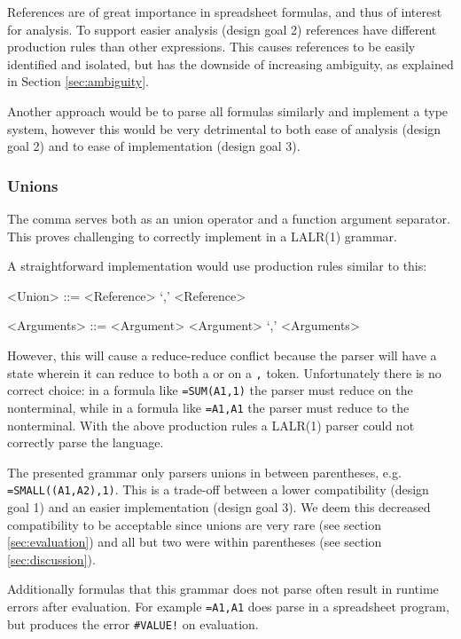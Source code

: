 \documentclass[conference]{IEEEtran}
\begin{document}
References are of great importance in spreadsheet formulas, and thus of interest for analysis.
To support easier analysis (design goal 2) references have different production rules than other expressions.
This causes references to be easily identified and isolated, but has the downside of increasing ambiguity, as explained in Section \ref{sec:ambiguity}. 

Another approach would be to parse all formulas similarly and implement a type system, however this would be very detrimental to both ease of analysis (design goal 2) and to ease of implementation (design goal 3).

\subsubsection{\textbf{Unions}}
\label{subsec:desing:unions}

The comma serves both as an union operator and a function argument separator.
This proves challenging to correctly implement in a LALR(1) grammar.

A straightforward implementation would use production rules similar to this:
\begin{grammar}
<Union> ::= <Reference> `,' <Reference>

<Arguments> ::= <Argument>
	\alt <Argument> `,' <Arguments>
\end{grammar}

However, this will cause a reduce-reduce conflict because the parser will have a state wherein it can reduce to both a  or  on a \texttt{,} token.
Unfortunately there is no correct choice: in a formula like \texttt{=SUM(A1,1)} the parser must reduce on the  nonterminal, while in a formula like \texttt{=A1,A1} the parser must reduce to the  nonterminal.
With the above production rules a LALR(1) parser could not correctly parse the language.

The presented grammar only parsers unions in between parentheses, e.g. \texttt{=SMALL((A1,A2),1)}.
This is a trade-off between a lower compatibility (design goal 1) and an easier implementation (design goal 3).
We deem this decreased compatibility to be acceptable since unions are very rare (see section \ref{sec:evaluation}) and all but two were within parentheses (see section \ref{sec:discussion}).

Additionally formulas that this grammar does not parse often result in runtime errors after evaluation.
For example \texttt{=A1,A1} does parse in a spreadsheet program, but produces the error \texttt{\#VALUE!} on evaluation.
\end{document}
